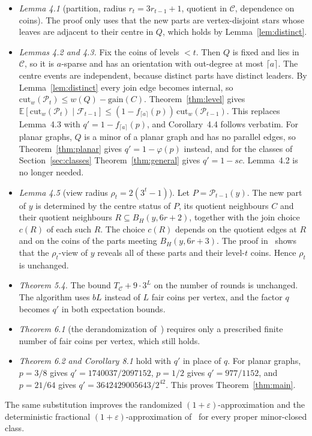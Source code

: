 \documentclass[11pt]{article}
\theoremstyle{remark}
\newcommand{\E}{\mathbb{E}}
\newcommand{\cut}{\mathrm{cut}}
\begin{document}
\begin{itemize}
\item \emph{Lemma 4.1} (partition, radius $r_t=3r_{t-1}+1$, quotient in $\mathcal{C}$, dependence
  on coins). The proof only uses that the new parts are vertex-disjoint stars whose leaves are
  adjacent to their centre in $Q$, which holds by Lemma~\ref{lem:distinct}.
\item \emph{Lemmas 4.2 and 4.3.} Fix the coins of levels $<t$. Then $Q$ is fixed and lies in
  $\mathcal{C}$, so it is $a$-sparse and has an orientation with out-degree at most $\lceil a\rceil$.
  The centre events are independent, because distinct parts have distinct leaders. By
  Lemma~\ref{lem:distinct} every join edge becomes internal, so
  $\cut_w(\mathcal{P}_t)\le w(Q)-\mathrm{gain}(C)$. Theorem~\ref{thm:level} gives
  $\E[\cut_w(\mathcal{P}_t)\mid\mathcal{F}_{t-1}]\le(1-f_{\lceil a\rceil}(p))\,\cut_w(\mathcal{P}_{t-1})$.
  This replaces Lemma~4.3 with $q'=1-f_{\lceil a\rceil}(p)$, and Corollary~4.4 follows verbatim.
  For planar graphs, $Q$ is a minor of a planar graph and has no parallel edges, so
  Theorem~\ref{thm:planar} gives $q'=1-\varphi(p)$ instead, and for the classes of
  Section~\ref{sec:classes} Theorem~\ref{thm:general} gives $q'=1-sc$. Lemma~4.2 is no longer needed.
\item \emph{Lemma 4.5} (view radius $\rho_t=2(3^t-1)$). Let $P=\mathcal{P}_{t-1}(y)$. The new part
  of $y$ is determined by the centre status of $P$, its quotient neighbours $C$ and their quotient
  neighbours $R\subseteq B_H(y,6r+2)$, together with the join choice $c(R)$ of each such $R$. The
  choice $c(R)$ depends on the quotient edges at $R$ and on the coins of the parts meeting
  $B_H(y,6r+3)$. The proof in~\cite{AS26} shows that the $\rho_t$-view of $y$ reveals all of
  these parts and their level-$t$ coins. Hence $\rho_t$ is unchanged.
\item \emph{Theorem 5.4.} The bound $T_{\mathcal C}+9\cdot3^L$ on the number of rounds is unchanged. The algorithm uses
  $bL$ instead of $L$ fair coins per vertex, and the factor $q$ becomes $q'$ in both expectation
  bounds.
\item \emph{Theorem 6.1} (the derandomization of~\cite{K05}) requires only a prescribed finite
  number of fair coins per vertex, which still holds.
\item \emph{Theorem 6.2 and Corollary 8.1} hold with $q'$ in place of $q$. For planar graphs,
  $p=3/8$ gives $q'=1740037/2097152$, $p=1/2$ gives $q'=977/1152$, and $p=21/64$ gives
  $q'=3642429005643/2^{42}$. This proves
  Theorem~\ref{thm:main}.
\end{itemize}
The same substitution improves the randomized $(1+\varepsilon)$-approximation and the
deterministic fractional $(1+\varepsilon)$-approximation of~\cite[Thm.~6.2]{AS26} for every
proper minor-closed class.
\end{document}
